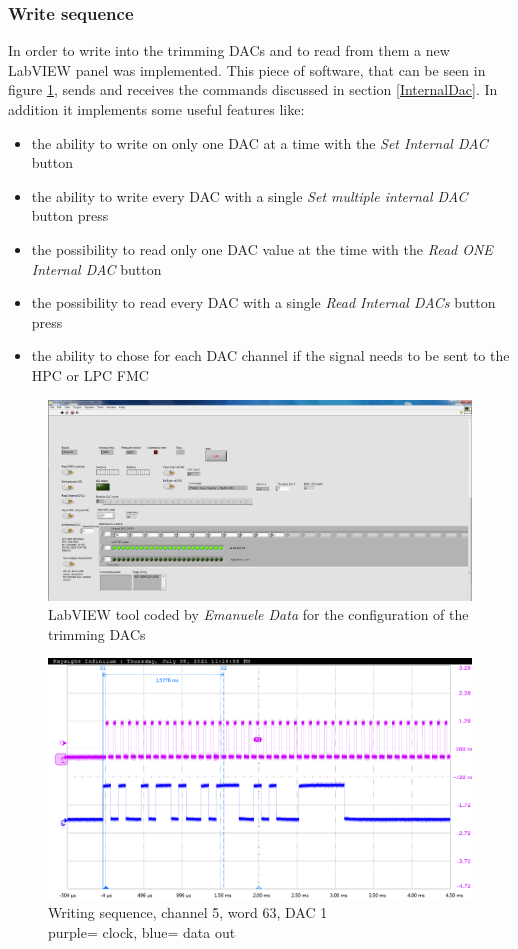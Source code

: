 \subsubsection{Write sequence}
\noindent In order to write into the trimming DACs and to read from them a new LabVIEW panel was implemented\cite{data}. This piece of software, that can be seen in figure \ref{fig:labview3}, sends and receives the commands discussed in section \ref{InternalDac}. In addition it implements some useful features like:
\begin{itemize}
	\item the ability to write on only one DAC at a time with the \textit{Set Internal DAC} button
	\item the ability to write every DAC with a single \textit{Set multiple internal DAC} button press
	\item the possibility to read only one DAC value at the time with the \textit{Read ONE Internal DAC} button
	\item the possibility to read every DAC with a single \textit{Read Internal DACs} button press
	\item the ability to chose for each DAC channel if the signal needs to be sent to the HPC or LPC FMC
\end{itemize}
\begin{figure}[H]
	\centering
	\includegraphics[width=0.99\linewidth]{IMG/ch3/LABVIEW2}
	\caption{LabVIEW tool coded by \textit{Emanuele Data} for the configuration of the trimming DACs}
	\label{fig:labview3}
\end{figure}
\begin{figure}[H]
	\centering
	\includegraphics[width=0.7\linewidth]{IMG/ch5/probe/09-08-2021_ch05-write63-baselinedac1}
	\caption{Writing sequence, channel 5, word 63, DAC 1\\{\color{magenta}purple}= clock, {\color{blue}blue}= data out}
	\label{fig:ch05write63}
\end{figure}
